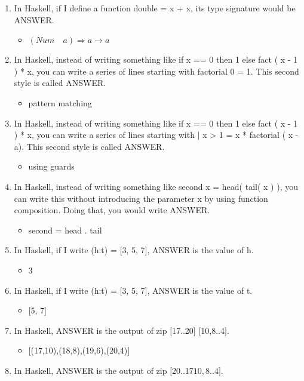 \documentclass{exam}
\begin{document}
\begin{enumerate}
\item In Haskell, if I define a function double = x + x, its type signature would be ANSWER.
\begin{itemize}
\item $(Num \quad a) \Rightarrow a \rightarrow a$
\end{itemize}
\item In Haskell, instead of writing something like if x == 0 then 1 else fact ( x - 1 ) * x, you can write a series of lines starting with factorial 0 = 1.  This second style is called ANSWER.
\begin{itemize}
\item pattern matching
\end{itemize}
\item In Haskell, instead of writing something like if x == 0 then 1 else fact ( x - 1 ) * x, you can write a series of lines starting with $|$ x > 1 = x * factorial ( x - a).  This second style is called ANSWER.
\begin{itemize}
\item using guards
\end{itemize}
\item In Haskell, instead of writing something like second x = head( tail(  x ) ), you can write this without introducing the parameter x by using function composition.  Doing that, you would write ANSWER.
\begin{itemize}
\item second = head . tail
\end{itemize}
\item In Haskell, if I write (h:t) = $\lbrack$3, 5, 7$\rbrack$, ANSWER is the value of h.
\begin{itemize}
\item 3
\end{itemize}
\item In Haskell, if I write (h:t) = $\lbrack$3, 5, 7$\rbrack$, ANSWER is the value of t.
\begin{itemize}
\item $\lbrack$5, 7$\rbrack$
\end{itemize}
\item In Haskell, ANSWER is the output of zip $\lbrack$17..20$\rbrack$ $\lbrack$10,8..4$\rbrack$.
\begin{itemize}
\item $\lbrack$(17,10),(18,8),(19,6),(20,4)$\rbrack$
\end{itemize}
\item In Haskell, ANSWER is the output of zip $\lbrack$20..17\rbrack$ $\lbrack$10,8..4\rbrack$.

\end{enumerate}
\end{document}
